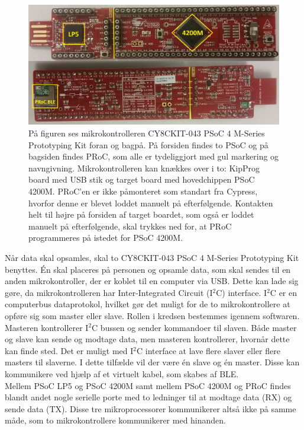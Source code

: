 \begin{figure}[H]
	\centering
	\includegraphics[scale=0.15]{figures/bProblemloesning/PSoC3.jpg}
	\caption{På figuren ses mikrokontrolleren CY8CKIT-043 PSoC 4 M-Series Prototyping Kit foran og bagpå. På forsiden findes to PSoC og på bagsiden findes PRoC, som alle er tydeliggjort med gul markering og navngivning. Mikrokontrolleren kan knækkes over i to: KipProg board med USB stik og target board med hovedchippen PSoC 4200M. PRoC'en er ikke påmonteret som standart fra Cypress, hvorfor denne er blevet loddet manuelt på efterfølgende. Kontakten helt til højre på forsiden af target boardet, som også er loddet manuelt på efterfølgende, skal trykkes ned for, at PRoC programmeres på istedet for PSoC 4200M. \citep{CYPRESS2016PSoC,Semiconductor2016}}
	\label{fig:PSoC}
\end{figure}\vspace{-0.2cm}
Når data skal opsamles, skal to CY8CKIT-043 PSoC 4 M-Series Prototyping Kit benyttes. Én skal placeres på personen og opsamle data, som skal sendes til en anden mikrokontroller, der er koblet til en computer via USB. Dette kan lade sig gøre, da mikrokontrolleren har Inter-Integrated Circuit (I$^{2}$C) interface. I$^{2}$C er en computerbus dataprotokol, hvilket gør det muligt for de to mikrokontrollere at opføre sig som master eller slave. Rollen i kredsen bestemmes igennem softwaren. Masteren kontrollerer I$^{2}$C bussen og sender kommandoer til slaven. Både master og slave kan sende og modtage data, men masteren kontrollerer, hvornår dette kan finde sted. Det er muligt med I$^{2}$C interface at lave flere slaver eller flere masters til slaverne. I dette tilfælde vil der være én slave og én master. Disse kan kommunikere ved hjælp af et virtuelt kabel, som skabes af BLE. \citep{Semiconductor2016,Sparkfun2016}\\
Mellem PSoC LP5 og PSoC 4200M samt mellem PSoC 4200M og PRoC findes blandt andet nogle serielle porte med to ledninger til at modtage data (RX) og sende data (TX). Disse tre mikroprocessorer kommunikerer altså ikke på samme måde, som to mikrokontrollere kommunikerer med hinanden. \citep{Semiconductor2016} \\
